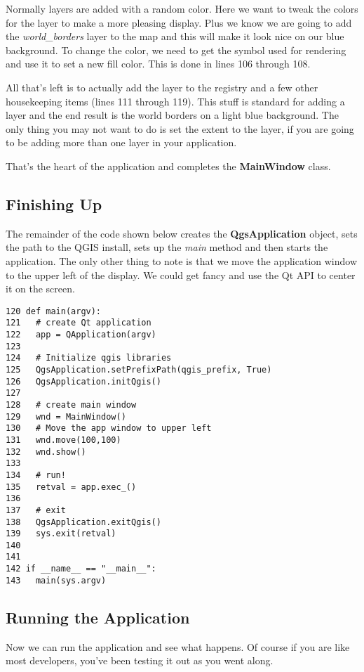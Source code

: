Normally layers are added with a random color. Here we want to tweak the colors for the layer to make a more pleasing
display. Plus we know we are going to add the \textsl{world\_borders} layer to the map and this will make it look nice
on our blue background. To change the color, we need to get the symbol used for rendering and use it to set a new fill color. This is done in lines
106 through 108. 

All that's left is to actually add the layer to the registry and a few other housekeeping items (lines
111 through 119). This stuff is standard for adding a layer and the
end result is the world borders on a light blue background. The only thing you may not want to do is set the extent to
the layer, if you are going to be adding more than one layer in your application.

That's the heart of the application and completes the \textbf{MainWindow} class. 

\subsection{Finishing Up}

The remainder of the code shown below 
creates the \textbf{QgsApplication} object, sets the path to the QGIS install, sets
up the \textsl{main} method and then starts the application. The only other thing to note is that we move the
application window to the upper left of the display. We could get fancy and use the Qt API to center it on the screen.

\begin{verbatim}
120 def main(argv):
121   # create Qt application
122   app = QApplication(argv)
123 
124   # Initialize qgis libraries
125   QgsApplication.setPrefixPath(qgis_prefix, True)
126   QgsApplication.initQgis()
127 
128   # create main window
129   wnd = MainWindow()
130   # Move the app window to upper left
131   wnd.move(100,100)
132   wnd.show()
133 
134   # run!
135   retval = app.exec_()
136   
137   # exit
138   QgsApplication.exitQgis()
139   sys.exit(retval)
140 
141 
142 if __name__ == "__main__":
143   main(sys.argv)
\end{verbatim}

\subsection{Running the Application}

Now we can run the application and see what happens. Of course if you are like most developers, you've been testing it
out as you went along. 

